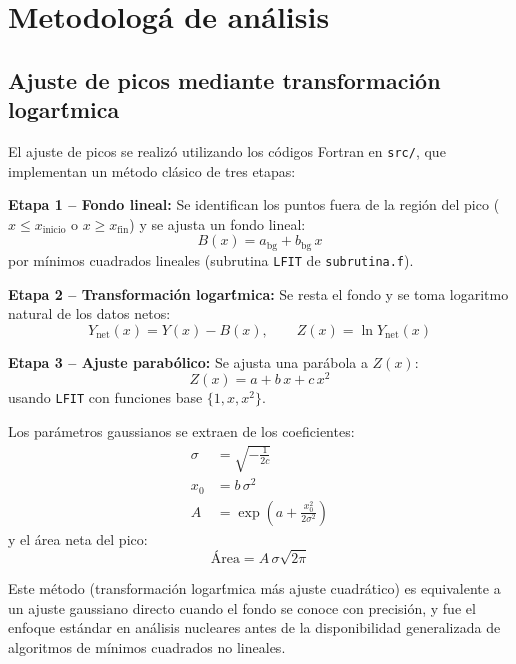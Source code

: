 \documentclass[12pt,a4paper]{article}
\begin{document}
\section{Metodolog\'a de an\'alisis}

\subsection{Ajuste de picos mediante transformaci\'on logar\'tmica}

El ajuste de picos se realiz\'o utilizando los c\'odigos Fortran en \texttt{src/},
que implementan un m\'etodo cl\'asico de tres etapas:

\textbf{Etapa 1 -- Fondo lineal:} Se identifican los puntos fuera de la regi\'on del pico
($x \le x_{\text{inicio}}$ o $x \ge x_{\text{fin}}$) y se ajusta un fondo lineal:
\begin{equation}
B(x) = a_{\text{bg}} + b_{\text{bg}}\,x
\end{equation}
por m\'inimos cuadrados lineales (subrutina \texttt{LFIT} de \texttt{subrutina.f}).

\textbf{Etapa 2 -- Transformaci\'on logar\'tmica:} Se resta el fondo y se toma logaritmo
natural de los datos netos:
\begin{equation}
Y_{\text{net}}(x) = Y(x) - B(x), \qquad Z(x) = \ln Y_{\text{net}}(x)
\end{equation}

\textbf{Etapa 3 -- Ajuste parab\'olico:} Se ajusta una par\'abola a $Z(x)$:
\begin{equation}
Z(x) = a + b\,x + c\,x^2
\end{equation}
usando \texttt{LFIT} con funciones base $\{1, x, x^2\}$.

Los par\'ametros gaussianos se extraen de los coeficientes:
\begin{align}
\sigma &= \sqrt{-\frac{1}{2c}} \\
x_0 &= b\,\sigma^2 \\
A &= \exp\!\left(a + \frac{x_0^2}{2\sigma^2}\right)
\end{align}
y el \'area neta del pico:
\begin{equation}
\text{\'Area} = A\,\sigma\sqrt{2\pi}
\end{equation}

Este m\'etodo (transformaci\'on logar\'tmica m\'as ajuste cuadr\'atico) es equivalente
a un ajuste gaussiano directo cuando el fondo se conoce con precisi\'on, y fue el
enfoque est\'andar en an\'alisis nucleares antes de la disponibilidad generalizada de
algoritmos de m\'inimos cuadrados no lineales.
\end{document}
